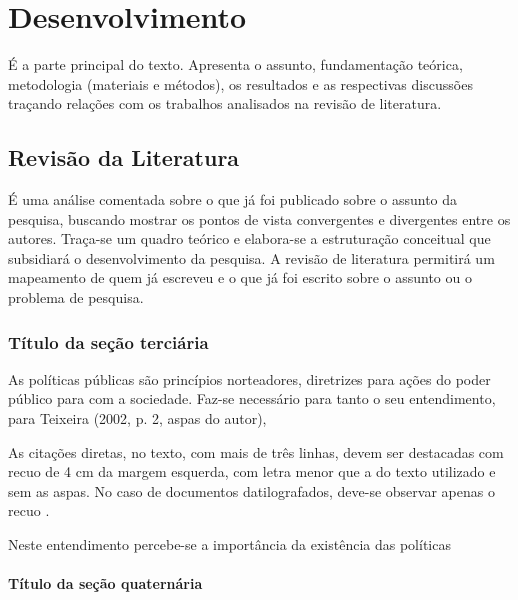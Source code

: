 \chapter{Desenvolvimento} \label{cha:desenvolvimento}

É a parte principal do texto. Apresenta o assunto, fundamentação teórica, metodologia (materiais e métodos), os resultados e as respectivas discussões traçando relações com os trabalhos analisados na revisão de literatura.


\section{Revisão da Literatura}

É uma análise comentada sobre o que já foi publicado sobre o assunto da pesquisa, buscando mostrar os pontos de vista convergentes e divergentes entre os autores. Traça-se um quadro teórico e elabora-se a estruturação conceitual que subsidiará o desenvolvimento da pesquisa. A revisão de literatura permitirá um mapeamento de quem já escreveu e o que já foi escrito sobre o assunto ou o problema de pesquisa.

\subsection{Título da seção terciária}

As políticas públicas são princípios norteadores, diretrizes para ações do 
poder público para com a sociedade. Faz-se necessário para tanto o seu 
entendimento, para Teixeira (2002, p. 2, aspas do autor),

\begin{citacao}
As citações diretas, no texto, com mais de três linhas, devem ser
destacadas com recuo de 4 cm da margem esquerda, com letra menor que a do texto
utilizado e sem as aspas. No caso de documentos datilografados, deve-se
observar apenas o recuo \cite[5.3]{NBR10520:2002}.
\end{citacao}

Neste entendimento percebe-se a importância da existência das políticas 

\subsubsection{Título da seção quaternária}

